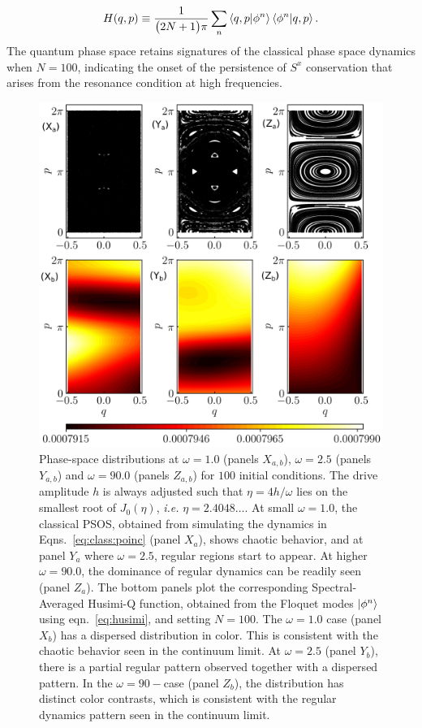\documentclass[%
reprint,
superscriptaddress,
amsmath,amssymb,
aps,
prb,
showkeys,
]{revtex4-2}
\begin{document}
	\begin{equation}
		H(q,p)\equiv \frac{1}{\big(2N+1\big)\pi}\sum_n \ip{q,p}{\phi^n}\ip{\phi^n}{q,p}.
		\label{eq:husimi}
	\end{equation}
	The quantum phase space retains signatures of the classical phase space dynamics when $N=100$, indicating the onset of the persistence of $S^x$ conservation that arises from the resonance condition at high frequencies. 
	\begin{figure}[t!]
		\centering
		\includegraphics[width = 9.0 cm]{lmg_poincare0111.jpeg}
		\caption{Phase-space distributions at $\omega=1.0$ (panels $X_{a,b}$), $\omega=2.5$ (panels $Y_{a,b}$) and $\omega=90.0$ (panels $Z_{a,b}$) for $100$ initial conditions. The drive amplitude $h$ is always adjusted such that $\eta=4h/\omega$ lies on the smallest root of $J_0(\eta)$, \textit{i.e.} $\eta=2.4048\dots$. At small $\omega=1.0$, the classical PSOS, obtained from simulating the dynamics in Eqns.~\ref{eq:class:poinc} (panel $X_{a}$),  shows chaotic behavior, and at panel $Y_{a}$ where $\omega = 2.5$, regular regions start to appear. At higher $\omega = 90.0$, the dominance of regular dynamics can be readily seen (panel $Z_{a}$). The bottom panels plot the corresponding Spectral-Averaged Husimi-Q function, obtained from the Floquet modes $\ket{\phi^n}$ using eqn.~\ref{eq:husimi}, and setting $N=100$. The $\omega=1.0$ case (panel $X_{b}$) has a dispersed distribution in color. This is consistent with the chaotic behavior seen in the continuum limit. At $\omega = 2.5$ (panel $Y_{b}$), there is a partial regular pattern observed together with a dispersed pattern. In the $\omega=90-$case (panel $Z_{b}$), the distribution has distinct color contrasts, which is consistent with the regular dynamics pattern seen in the continuum limit.}
		\label{fig:classical_lipkin}
	\end{figure}
\end{document}
